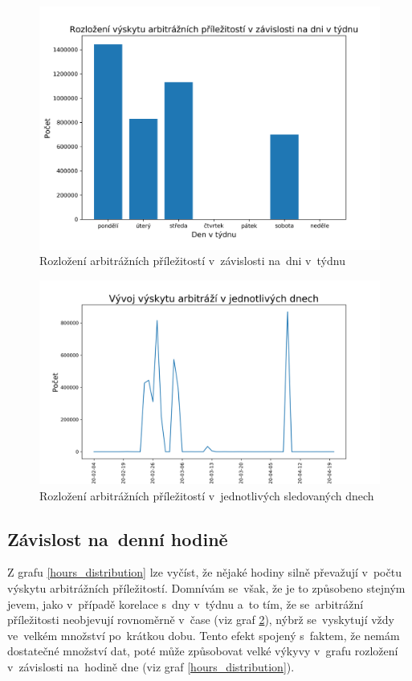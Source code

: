 \documentclass[thesis=B,czech]{FITthesis}[2019/03/21]
\begin{document}
\begin{figure}\centering
	\includegraphics[width=1\textwidth]{images/weekday_distribution.png}
	\caption{Rozložení arbitrážních příležitostí v~závislosti na~dni v~týdnu }\label{weekday_distribution}
\end{figure}
\begin{figure}\centering
	\includegraphics[width=1\textwidth]{images/occurences.png}
	\caption{Rozložení arbitrážních příležitostí v~jednotlivých sledovaných dnech}\label{occurences}
\end{figure}
\subsection{Závislost na~denní hodině}
Z grafu \ref{hours_distribution} lze vyčíst, že nějaké hodiny silně převažují v~počtu výskytu arbitrážních příležitostí. Domnívám se~však, že je to způsobeno stejným jevem, jako v~případě korelace s~dny v~týdnu a~to tím, že se~arbitrážní příležitosti neobjevují rovnoměrně v~čase (viz graf \ref{occurences}), nýbrž se~vyskytují vždy ve~velkém množství po~krátkou dobu. Tento efekt spojený s~faktem, že nemám dostatečné množství dat, poté může způsobovat velké výkyvy v~grafu rozložení v~závislosti na~hodině dne (viz graf \ref{hours_distribution}).
\end{document}

